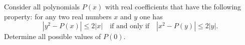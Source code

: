 Consider all polynomials $P(x)$ with real coefficients that have the following property: for any two real numbers $x$ and $y$ one has
\[ |y^2 - P(x)| \leq 2|x| \quad \text{if and only if} \quad |x^2 - P(y)| \leq 2|y|. \]
Determine all possible values of $P(0)$.
